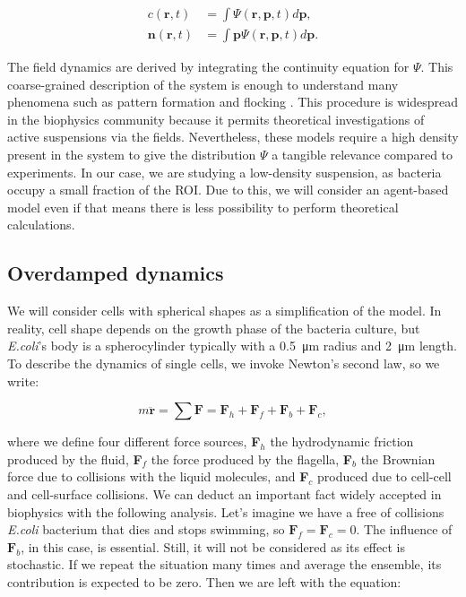 \begin{align}
	c(\textbf{r},t) &= \int \Psi(\textbf{r},\textbf{p},t) d\textbf{p}, \\
	\textbf{n}(\textbf{r},t) &= \int \textbf{p} \Psi(\textbf{r},\textbf{p},t)d\textbf{p}.
\end{align}

The field dynamics are derived by integrating the continuity equation for $\Psi$. This coarse-grained description of the system is enough to understand many phenomena such as pattern formation and flocking \cite{Saintillan2008InstabilitiesSimulations,Toner1998FlocksFlocking}. This procedure is widespread in the biophysics community because it permits theoretical investigations of active suspensions via the fields. Nevertheless, these models require a high density present in the system to give the distribution $\Psi$ a tangible relevance compared to experiments.  In our case, we are studying a low-density suspension, as bacteria occupy a small fraction of the ROI. Due to this, we will consider an agent-based model even if that means there is less possibility to perform theoretical calculations.

\subsection{Overdamped dynamics}

We will consider cells with spherical shapes as a simplification of the model. In reality, cell shape depends on the growth phase of the bacteria culture, but \textit{E.coli}'s body is a spherocylinder typically with a \SI{0.5}{\micro\meter} radius and \SI{2}{\micro\meter} length. To describe the dynamics of single cells, we invoke Newton's second law, so we write: 

\begin{equation}
	m\ddot{\textbf{r}} = \sum \textbf{F} = \textbf{F}_h + \textbf{F}_f + \textbf{F}_b + \textbf{F}_c ,
\end{equation}

where we define four different force sources, \textbf{F}$_h$ the hydrodynamic friction produced by the fluid, \textbf{F}$_f$ the force produced by the flagella, \textbf{F}$_b$ the Brownian force due to collisions with the liquid molecules, and \textbf{F}$_c$ produced due to cell-cell and cell-surface collisions. We can deduct an important fact widely accepted in biophysics with the following analysis. Let's imagine we have a free of collisions \textit{E.coli} bacterium that dies and stops swimming, so $\textbf{F}_f = \textbf{F}_c =0$. The influence of $\textbf{F}_b$, in this case, is essential. Still, it will not be considered as its effect is stochastic. If we repeat the situation many times and average the ensemble, its contribution is expected to be zero. Then we are left with the equation:


